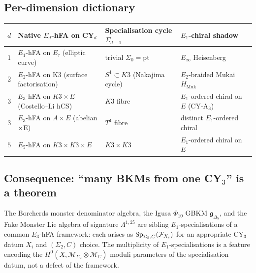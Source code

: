 \subsection{Per-dimension dictionary}
\label{wn:subsec:per-dim-dictionary}

\begin{center}
\renewcommand{\arraystretch}{1.22}
\begin{tabular}{|c|l|l|l|}
\hline
$d$ & Native $E_d$-hFA on CY$_d$ & Specialisation cycle $\Sigma_{d-1}$ & $E_1$-chiral shadow \\
\hline
$1$ & $E_1$-hFA on $E_\tau$ (elliptic curve) & trivial $\Sigma_0 = \mathrm{pt}$ & $E_\infty$ Heisenberg \\
$2$ & $E_2$-hFA on K3 (surface factorisation) & $S^1 \subset K3$ (Nakajima cycle) & $E_2$-braided Mukai $H_{\mathrm{Muk}}$ \\
$3$ & $E_3$-hFA on $K3\times E$ (Costello--Li hCS) & $K3$ fibre & $E_1$-ordered chiral on $E$ (CY-A$_3$) \\
$3$ & $E_3$-hFA on $A \times E$ (abelian$\times$E) & $T^4$ fibre & distinct $E_1$-ordered chiral \\
$5$ & $E_5$-hFA on $K3 \times K3 \times E$ & $K3 \times K3$ & $E_1$-ordered chiral on $E$ \\
\hline
\end{tabular}
\end{center}

\subsection{Consequence: ``many BKMs from one CY$_3$'' is a theorem}
\label{wn:subsec:many-BKMs-theorem-grade}

\begin{conjecture}\ClaimStatusConjectured
\label{wn:conj:sibling-specialisation}
The Borcherds monster denominator algebra, the Igusa $\Phi_{10}$ GBKM
$\mathfrak{g}_{\Delta_5}$, and the Fake Monster Lie algebra of signature
$\Lambda^{1,25}$ are sibling $E_1$-specialisations of a common $E_3$-hFA
framework: each arises as $\mathrm{Sp}_{\Sigma_2, C}(\mathcal{F}_{X_i})$ for an
appropriate CY$_3$ datum $X_i$ and $(\Sigma_2, C)$ choice. The multiplicity of
$E_1$-specialisations is a feature encoding the
$H^0(X, \mathcal{M}_{\Sigma_2} \otimes \mathcal{M}_C)$ moduli parameters of
the specialisation datum, not a defect of the framework.
\end{conjecture}

